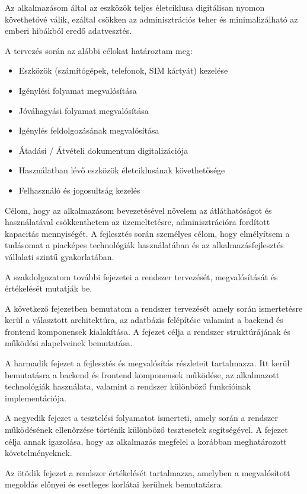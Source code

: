 \documentclass[
]{thesis-ekf}
\theoremstyle{definition}
\theoremstyle{remark}
\begin{document}
Az alkalmazásom által az eszközök teljes életciklusa digitálisan nyomon követhetővé válik, ezáltal csökken az adminisztrációs teher és minimalizálható az emberi hibákból eredő adatvesztés.

A tervezés során az alábbi célokat határoztam meg:
\begin{itemize}
	\item Eszközök (számítógépek, telefonok, SIM kártyát) kezelése
	\item Igénylési folyamat megvalósítása
	\item Jóváhagyási folyamat megvalósítása
	\item Igénylés feldolgozásának megvalósítása
	\item Átadási / Átvételi dokumentum digitalizációja
	\item Használatban lévő eszközök életciklusának követhetősége
	\item Felhasználó és jogosultság kezelés
\end{itemize}

Célom, hogy az alkalmazásom bevezetésével növelem az átláthatóságot és használatával csökkenthetem az üzemeltetésre, adminisztrációra fordított kapacitás mennyiségét.
A fejlesztés során személyes célom, hogy elmélyítsem a tudásomat a piacképes technológiák használatában és az alkalmazásfejlesztés vállalati szintű gyakorlatában.

A szakdolgozatom további fejezetei a rendszer tervezését, megvalósítását és értékelését mutatják be.

A következő fejezetben bemutatom a rendszer tervezését amely során ismertetésre kerül a választott architektúra, az adatbázis felépítése valamint a backend és frontend komponensek kialakítása. A fejezet célja a rendszer struktúrájának és működési alapelveinek bemutatása.

A harmadik fejezet a fejlesztés és megvalósítás részleteit tartalmazza. Itt kerül bemutatásra a backend és frontend komponensek működése, az alkalmazott technológiák használata, valamint a rendszer különböző funkcióinak implementációja.

A negyedik fejezet a tesztelési folyamatot ismerteti, amely során a rendszer működésének ellenőrzése történik különböző tesztesetek segítségével. A fejezet célja annak igazolása, hogy az alkalmazás megfelel a korábban meghatározott követelményeknek.

Az ötödik fejezet a rendszer értékelését tartalmazza, amelyben a megvalósított megoldás előnyei és esetleges korlátai kerülnek bemutatásra.
\end{document}
